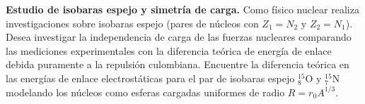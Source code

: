 \item \textbf{Estudio de isobaras espejo y simetría de carga.}
Como físico nuclear realiza investigaciones sobre isobaras espejo (pares de núcleos con $Z_1 = N_2$ y $Z_2 = N_1$). Desea investigar la independencia de carga de las fuerzas nucleares comparando las mediciones experimentales con la diferencia teórica de energía de enlace debida puramente a la repulsión culombiana. Encuentre la diferencia teórica en las energías de enlace electrostáticas para el par de isobaras espejo $^{15}_{8}\text{O}$ y $^{15}_{7}\text{N}$ modelando los núcleos como esferas cargadas uniformes de radio $R = r_0 A^{1/3}$.